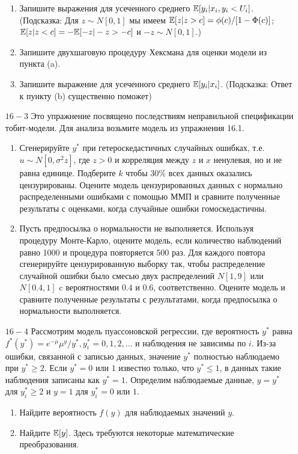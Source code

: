 \begin{enumerate}
\begin{enumerate}
\item  Запишите выражения для усеченного среднего $\mathbb{E}[y_i | x_i,y_i<U_i]$. (Подсказка: Для $z \sim N[0,1]$ мы имеем $\mathbb{E}[z|z>c]=\phi(c)/[1-\Phi(c)]$; $\mathbb{E}[z|z<c]=-\mathbb{E}[-z|-z>-c]$ и $-z \sim N[0,1].$)

\item Запишите двухшаговую процедуру Хексмана для оценки модели из пункта (a).

\item  Запишите выражение для усеченного среднего $\mathbb{E}[y_i|x_i]$. (Подсказка: Ответ к пункту (b) существенно поможет)
\end{enumerate}
\item [$16 - 3$] Это упражнение посвящено последствиям неправильной спецификации тобит-модели. Для анализа возьмите модель из упражнения 16.1.
\begin{enumerate}
\item  Сгенерируйте $y^* $ при гетероскедастичных случайных ошибках, т.е. $u \sim N[0,\sigma^2z]$, где $z>0$ и корреляция между $z$ и $x$ ненулевая, но и не равна единице. Подберите $k$ чтобы $30\%$ всех данных оказались цензурированы. Оцените модель цензурированных данных с нормально распределенными ошибками с помощью ММП и сравните полученные результаты с оценками, когда случайные ошибки гомоскедастичны.

\item  Пусть предпосылка о нормальности не выполняется. Используя процедуру Монте-Карло, оцените модель, если количество наблюдений равно 1000 и процедура повторяется 500 раз. Для каждого повтора сгенерируйте цензурированную выборку так, чтобы распределение случайной ошибки было смесью двух распределений  $N[1,9]$ или $N[0.4,1]$ c вероятностями $0.4$ и $0.6$, соответственно. Оцените модель и сравните полученные результаты с результатами, когда предпосылка о нормальности выполняется.
\end{enumerate}
\item [$16 - 4$] Рассмотрим модель пуассоновской регрессии, где вероятность $y^* $ равна $f^{*}(y^* )=e^{-\mu}\mu^{y}/y^* , y_i^{*}=0,1,2,\ldots $ и наблюдения не зависимы по $i$. Из-за ошибки, связанной с записью данных, значение $y^*$ полностью наблюдаемо при $y^* {\geq}2$. Если $y^* =0$ или $1$ известно только, что $y^*  \leq 1$, в данных такие наблюдения записаны как $y^* =1$. Определим наблюдаемые данные, $y=y^* $ для $y_i^{*}{\geq}2$ и $y=1$ для $y_i^{*}=0$ или $1$.
\begin{enumerate}
\item  Найдите вероятность $f(y)$ для наблюдаемых значений $y$.
\item  Найдите $\mathbb{E}[y]$. Здесь требуются некоторые математические преобразования.



\end{enumerate}
\end{enumerate}
